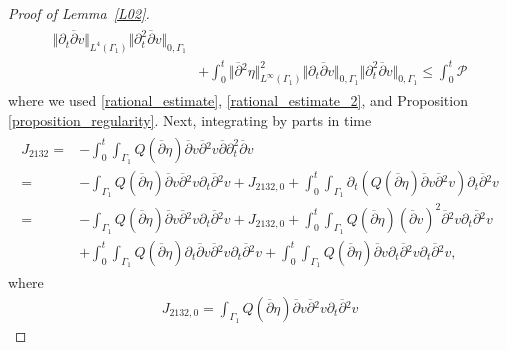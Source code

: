 \documentclass[10pt,reqno]{amsart}
\theoremstyle{plain}
\theoremstyle{definition}
\numberwithin{equation}{section}
\newcommand{\ccP}{\mathscr{P}}
\newcommand{\Ga}{\Gamma}
\newcommand{\norm}[1]{\Vert#1\Vert}
\begin{document}
\begin{proof}[Proof of Lemma~\ref{L02}]
\begin{align}
\begin{split}
\norm{\partial_t \overline{\partial} v}_{L^4(\Ga_1)} \norm{\partial^2_t \overline{\partial} v }_{0,\Ga_1}
\\
& 
+
\int_0^t \norm{\overline{\partial}{}^2 \eta}_{L^\infty(\Ga_1)}^2 \norm{\partial_t \overline{\partial}
v}_{0,\Ga_1} \norm{\partial^2_t \overline{\partial} v}_{0,\Ga_1}
\leq 
\int_{0}^{t}\ccP
\end{split}
\nonumber
\end{align}
where we used \eqref{rational_estimate}, \eqref{rational_estimate_2}, and Proposition
\ref{proposition_regularity}.
Next, integrating by parts in time
\begin{align}
\begin{split}
J_{2132} = &
-\int_0^t \int_{\Ga_1} Q(\overline{\partial} \eta) \overline{\partial} v
\overline{\partial}{}^2 v \overline{\partial} \partial^2_t \overline{\partial} v
\\
= &
- \int_{\Ga_1}  Q(\overline{\partial} \eta) \overline{\partial} v
\overline{\partial}{}^2 v  \partial_t \overline{\partial}{}^2 v
+ J_{2132,0} 
+ \int_0^t \int_{\Ga_1} \partial_t ( Q(\overline{\partial} \eta) \overline{\partial} v
\overline{\partial}{}^2 v  ) \partial_t \overline{\partial}{}^2 v
\\
= &
- \int_{\Ga_1}  Q(\overline{\partial} \eta) \overline{\partial} v
\overline{\partial}{}^2 v  \partial_t \overline{\partial}{}^2 v
+ J_{2132,0} 
+ \int_0^t \int_{\Ga_1} Q(\overline{\partial} \eta) (\overline{\partial} v)^2
\overline{\partial}{}^2 v   \partial_t \overline{\partial}{}^2 v
\\
&  
+ \int_0^t \int_{\Ga_1} Q(\overline{\partial} \eta) \partial_t \overline{\partial} v
\overline{\partial}{}^2 v   \partial_t \overline{\partial}{}^2 v
+ \int_0^t \int_{\Ga_1} Q(\overline{\partial} \eta) \overline{\partial} v
\partial_t \overline{\partial}{}^2 v  \partial_t \overline{\partial}{}^2 v,
\end{split}
\nonumber
\end{align}
where
\begin{gather}
 J_{2132,0} = 
 \left. \int_{\Ga_1}  Q(\overline{\partial} \eta) \overline{\partial} v
\overline{\partial}{}^2 v  \partial_t \overline{\partial}{}^2 v 

\end{gather}
\end{proof}
\end{document}

